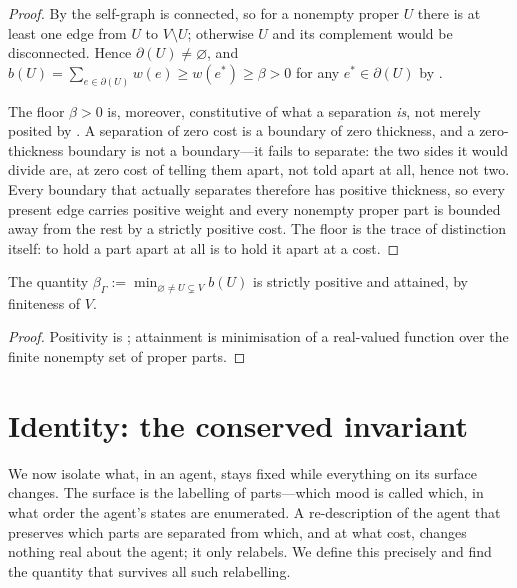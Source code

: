 \documentclass[11pt,twocolumn,a4paper]{article}
\newcommand{\Self}{\Gamma}          %
\newcommand{\V}{V}
\newcommand{\wt}{w}
\newcommand{\floorc}{\beta}          %
\newcommand{\cut}{\partial}
\begin{document}
\begin{proof}
By  the self-graph is connected, so for a nonempty
proper $U$ there is at least one edge from $U$ to $\V\setminus U$;
otherwise $U$ and its complement would be disconnected. Hence
$\cut(U)\neq\varnothing$, and $b(U)=\sum_{e\in\cut(U)}\wt(e)\ge\wt(e^\ast)
\ge\floorc>0$ for any $e^\ast\in\cut(U)$ by .

The floor $\floorc>0$ is, moreover, constitutive of what a separation
\emph{is}, not merely posited by . A separation of zero
cost is a boundary of zero thickness, and a zero-thickness boundary is not
a boundary---it fails to separate: the two sides it would divide are, at
zero cost of telling them apart, not told apart at all, hence not two.
Every boundary that actually separates therefore has positive thickness,
so every present edge carries positive weight and every nonempty proper
part is bounded away from the rest by a strictly positive cost. The floor
is the trace of distinction itself: to hold a part apart at all is to hold
it apart at a cost.
\end{proof}

\begin{corollary}
\label{cor:realised}
The quantity $\floorc_\Self:=\min_{\varnothing\neq U\subsetneq\V}b(U)$ is
strictly positive and attained, by finiteness of $\V$.
\end{corollary}

\begin{proof}
Positivity is ; attainment is minimisation of a
real-valued function over the finite nonempty set of proper parts.
\end{proof}

\section{Identity: the conserved invariant}
\label{sec:identity}

We now isolate what, in an agent, stays fixed while everything on its
surface changes. The surface is the labelling of parts---which mood is
called which, in what order the agent's states are enumerated. A
re-description of the agent that preserves which parts are separated from
which, and at what cost, changes nothing real about the agent; it only
relabels. We define this precisely and find the quantity that survives
all such relabelling.
\end{document}
